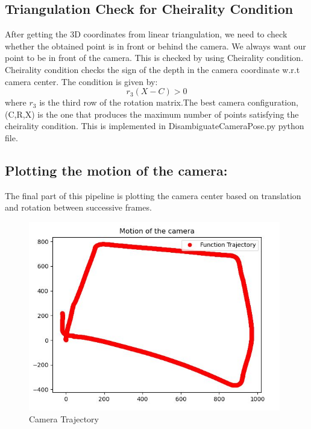 \documentclass[12pt]{article}
\begin{document}
\subsection{Triangulation Check for Cheirality Condition}
After getting the 3D coordinates from linear triangulation, we need to check whether the obtained point is in front or behind the camera. We always want our point to be in front of the camera. This is checked by using Cheirality condition. Cheirality condition checks the sign of the depth in the camera coordinate w.r.t camera center. The condition is given by:
\begin{equation}
r_3(X - C) > 0
\end{equation}
where $r_3$ is the third row of the rotation matrix.The best camera configuration, (C,R,X) is the one that produces the maximum number of points satisfying the cheirality condition. This is implemented in DisambiguateCameraPose.py python file.

\subsection{Plotting the motion of the camera:}
The final part of this pipeline is plotting the camera center based on translation and rotation between successive frames.
\newpage
\begin{figure}[h]
    \centering
    \includegraphics[width=11cm]{output1}
    \caption{Camera Trajectory}
    \label{fig:Camera Trajectory}
\end{figure}
\end{document}
